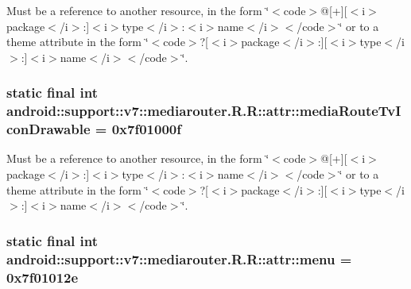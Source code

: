 Must be a reference to another resource, in the form \char`\"{}$<$code$>$@\mbox{[}+\mbox{]}\mbox{[}$<$i$>$package$<$/i$>$:\mbox{]}$<$i$>$type$<$/i$>$:$<$i$>$name$<$/i$>$$<$/code$>$\char`\"{} or to a theme attribute in the form \char`\"{}$<$code$>$?\mbox{[}$<$i$>$package$<$/i$>$:\mbox{]}\mbox{[}$<$i$>$type$<$/i$>$:\mbox{]}$<$i$>$name$<$/i$>$$<$/code$>$\char`\"{}. \hypertarget{classandroid_1_1support_1_1v7_1_1mediarouter_1_1_r_1_1attr_59564238f48d0aff2846f8b5dee03802}{
\subsubsection[{mediaRouteTvIconDrawable}]{\setlength{\rightskip}{0pt plus 5cm}static final int android::support::v7::mediarouter.R.R::attr::mediaRouteTvIconDrawable = 0x7f01000f}}
\label{classandroid_1_1support_1_1v7_1_1mediarouter_1_1_r_1_1attr_59564238f48d0aff2846f8b5dee03802}


Must be a reference to another resource, in the form \char`\"{}$<$code$>$@\mbox{[}+\mbox{]}\mbox{[}$<$i$>$package$<$/i$>$:\mbox{]}$<$i$>$type$<$/i$>$:$<$i$>$name$<$/i$>$$<$/code$>$\char`\"{} or to a theme attribute in the form \char`\"{}$<$code$>$?\mbox{[}$<$i$>$package$<$/i$>$:\mbox{]}\mbox{[}$<$i$>$type$<$/i$>$:\mbox{]}$<$i$>$name$<$/i$>$$<$/code$>$\char`\"{}. \hypertarget{classandroid_1_1support_1_1v7_1_1mediarouter_1_1_r_1_1attr_569159b255e81bd388ad5e913d99ca48}{
\subsubsection[{menu}]{\setlength{\rightskip}{0pt plus 5cm}static final int android::support::v7::mediarouter.R.R::attr::menu = 0x7f01012e}}
\label{classandroid_1_1support_1_1v7_1_1mediarouter_1_1_r_1_1attr_569159b255e81bd388ad5e913d99ca48}



